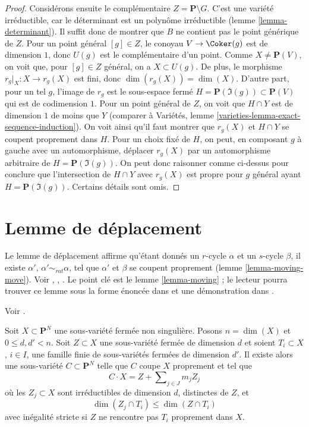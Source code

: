 \begin{proof}
\medskip\noindent
Considérons ensuite le complémentaire $Z = \mathbf{P} \setminus G$.
C'est une variété irréductible, car le déterminant est un
polynôme irréductible (lemme \ref{lemma-determinant}).
Il suffit donc de montrer que $B$ ne contient pas le
point générique de $Z$. Pour un point général $[g] \in Z$,
le conoyau $V \to \Coker(g)$ est de dimension $1$, donc
$U(g)$ est le complémentaire d'un point. Comme $X \not = \mathbf{P}(V)$,
on voit que, pour $[g] \in Z$ général, on a $X \subset U(g)$.
De plus, le morphisme $r_g|_X : X \to r_g(X)$ est fini, donc
$\dim(r_g(X)) = \dim(X)$.
D'autre part, pour un tel $g$, l'image de $r_g$ est le
sous-espace fermé $H = \mathbf{P}(\Im(g)) \subset \mathbf{P}(V)$
qui est de codimension $1$.
Pour un point général de $Z$, on voit que $H \cap Y$ est de dimension $1$
de moins que $Y$ (comparer à
Variétés, lemme \ref{varieties-lemma-exact-sequence-induction}).
On voit ainsi qu'il faut montrer que $r_g(X)$ et $H \cap Y$
se coupent proprement dans $H$. Pour un choix fixé de $H$, on peut,
en composant $g$ à gauche avec un automorphisme, déplacer $r_g(X)$ par
un automorphisme arbitraire de $H = \mathbf{P}(\Im(g))$.
On peut donc raisonner comme ci-dessus pour conclure que l'intersection
de $H \cap Y$ avec $r_g(X)$ est propre pour $g$ général ayant
$H = \mathbf{P}(\Im(g))$. Certains détails sont omis.
\end{proof}







\section{Lemme de déplacement}
\label{section-moving-lemma}

\noindent
Le lemme de déplacement affirme qu'étant donnés un $r$-cycle $\alpha$ et un $s$-cycle
$\beta$, il existe $\alpha'$, $\alpha' \sim_{rat} \alpha$, tel que
$\alpha'$ et $\beta$ se coupent proprement (lemme \ref{lemma-moving-move}).
Voir \cite{Samuel}, \cite{ChevalleyI}, \cite{ChevalleyII}.
Le point clé est le lemme \ref{lemma-moving} ; le lecteur pourra trouver
ce lemme sous la forme énoncée dans
\cite[Example 11.4.1]{F} et une démonstration dans \cite{Roberts}.

\begin{lemma}
\label{lemma-moving}
\begin{reference}
Voir \cite{Roberts}.
\end{reference}
Soit $X \subset \mathbf{P}^N$ une sous-variété fermée non singulière.
Posons $n = \dim(X)$ et $0 \leq d, d' < n$. Soit $Z \subset X$ une sous-variété
fermée de dimension $d$ et soient $T_i \subset X$, $i \in I$, une famille finie
de sous-variétés fermées de dimension $d'$. Il existe alors
une sous-variété $C \subset \mathbf{P}^N$ telle que $C$ coupe $X$
proprement et tel que
$$
C \cdot X = Z + \sum\nolimits_{j \in J} m_j Z_j
$$
où les $Z_j \subset X$ sont irréductibles de dimension $d$, distinctes de $Z$, et
$$
\dim(Z_j \cap T_i) \leq \dim(Z \cap T_i)
$$
avec inégalité stricte si $Z$ ne rencontre pas $T_i$ proprement dans $X$.
\end{lemma}

